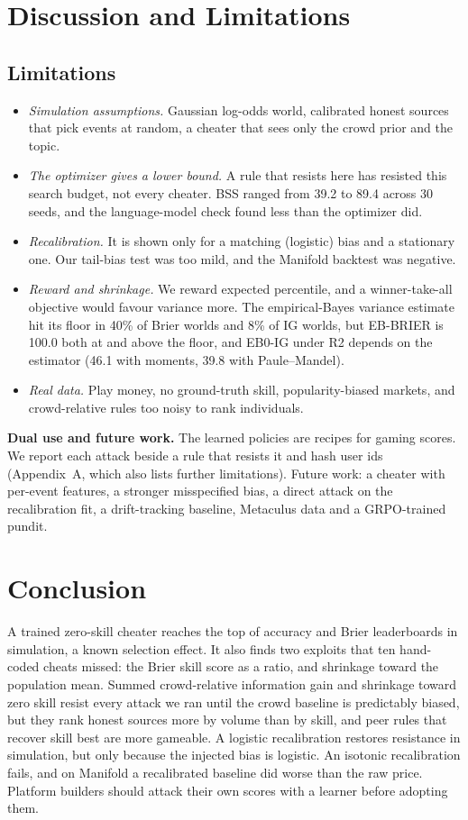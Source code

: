 \documentclass[10pt]{article}
\begin{document}
\section{Discussion and Limitations}
\subsection*{Limitations}
\begin{itemize}\setlength{\itemsep}{1pt}\setlength{\parskip}{0pt}
\item \emph{Simulation assumptions.} Gaussian log-odds world, calibrated honest sources that pick events at random, a cheater that sees only the crowd prior and the topic.
\item \emph{The optimizer gives a lower bound.} A rule that resists here has resisted this search budget, not every cheater. BSS ranged from 39.2 to 89.4 across 30 seeds, and the language-model check found less than the optimizer did.
\item \emph{Recalibration.} It is shown only for a matching (logistic) bias and a stationary one. Our tail-bias test was too mild, and the Manifold backtest was negative.
\item \emph{Reward and shrinkage.} We reward expected percentile, and a winner-take-all objective would favour variance more. The empirical-Bayes variance estimate hit its floor in 40\% of Brier worlds and 8\% of IG worlds, but EB-BRIER is 100.0 both at and above the floor, and EB0-IG under R2 depends on the estimator (46.1 with moments, 39.8 with Paule--Mandel).
\item \emph{Real data.} Play money, no ground-truth skill, popularity-biased markets, and crowd-relative rules too noisy to rank individuals.
\end{itemize}
\textbf{Dual use and future work.} The learned policies are recipes for gaming scores. We report each attack beside a rule that resists it and hash user ids (Appendix~A, which also lists further limitations). Future work: a cheater with per-event features, a stronger misspecified bias, a direct attack on the recalibration fit, a drift-tracking baseline, Metaculus data and a GRPO-trained pundit.

\section{Conclusion}
A trained zero-skill cheater reaches the top of accuracy and Brier leaderboards in simulation, a known selection effect. It also finds two exploits that ten hand-coded cheats missed: the Brier skill score as a ratio, and shrinkage toward the population mean. Summed crowd-relative information gain and shrinkage toward zero skill resist every attack we ran until the crowd baseline is predictably biased, but they rank honest sources more by volume than by skill, and peer rules that recover skill best are more gameable. A logistic recalibration restores resistance in simulation, but only because the injected bias is logistic. An isotonic recalibration fails, and on Manifold a recalibrated baseline did worse than the raw price. Platform builders should attack their own scores with a learner before adopting them.
\end{document}
